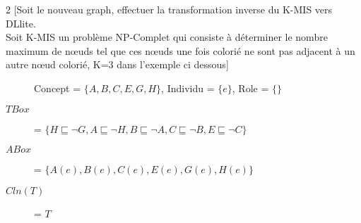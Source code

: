 \begin{multicols}{2}
[Soit le nouveau graph, effectuer la transformation inverse du K-MIS vers DLlite.\\
Soit K-MIS un problème NP-Complet qui consiste à déterminer le nombre maximum de nœuds
tel que ces nœuds une fois colorié ne sont pas adjacent à un autre nœud colorié, K=3 dans l'exemple ci dessous]


\begin{description}
\item[] Concept = $\{A,B,C,E,G,H\}$, Individu = $\{e\}$, Role = $\{\}$
\item[$TBox$] = $\{H \sqsubseteq \neg G, A \sqsubseteq \neg H,B \sqsubseteq \neg A,C \sqsubseteq \neg B,E \sqsubseteq \neg C\}$
\item[$ABox$] = $\{ A(e), B(e), C(e), E(e), G(e), H(e) \}$
\item[$Cln(T)$] = $T$
\end{description}

\end{multicols}

\pagebreak